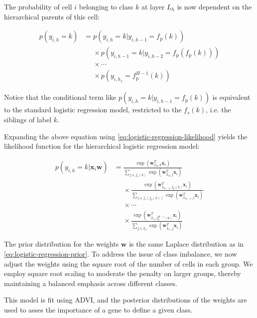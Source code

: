 The probability of cell $i$ belonging to class $k$ at layer $L_h$ is now dependent on the hierarchical parents of this cell:

\begin{equation}
    \begin{aligned}
    p(y_{i,h} = k) &= p(y_{i,h} = k | y_{i,h-1} = f_{\text{p}}(k)) \\
    &\phantom{=} \times p(y_{i,h-1} = k | y_{i,h-2} = f_{\text{p}}(f_{\text{p}}(k))) \\
    &\phantom{=} \times \cdots \\
    &\phantom{=} \times p(y_{i,h_1} = f_{\text{p}}^{H-1}(k))
    \end{aligned}
\end{equation}

Notice that the conditional term like $p(y_{i,h} = k | y_{i,h-1} = f_{\text{p}}(k))$ is equivalent to the standard logistic regression model, restricted to the $f_s(k)$, i.e. the siblings of label $k$. 

Expanding the above equation using \cref{eq:logistic-regression-likelihood} yields the likelihood function for the hierarchical logistic regression model:

\begin{equation}
    \begin{aligned}
    p(y_{i,h} = k | \mathbf{x}_{i} \mathbf{w}) &= 
         \frac{\exp(\mathbf{w}_{L_h, k}^T \mathbf{x}_i)}{\sum_{j \in f_s(k)} \exp(\mathbf{w}_{L_h, j}^T \mathbf{x}_i)} \\
        &\phantom{=} \times \frac{\exp(\mathbf{w}_{L_{h-1}, f_p(k)}^T \mathbf{x}_i)}{\sum_{j \in  f_s(f_p(k))} \exp(\mathbf{w}_{L_{h-1}, j}^T \mathbf{x}_i)} \\
        &\phantom{=} \times \cdots \\
        &\phantom{=} \times \frac{\exp(\mathbf{w}_{L_1, f_p^{H-1}(k)}^T \mathbf{x}_i)}{\sum_{j \in L_1} \exp(\mathbf{w}_{L_1, j}^T \mathbf{x}_i)}
    \end{aligned}
\end{equation}

The prior distribution for the weights $\mathbf{w}$ is the same Laplace distribution as in \cref{eq:logistic-regression-prior}. To address the issue of class imbalance, we now adjust the weights using the square root of the number of cells in each group. We employ square root scaling to moderate the penalty on larger groups, thereby maintaining a balanced emphasis across different classes.

This model is fit using \ac{ADVI}, and the posterior distributions of the weights are used to asses the importance of a gene to define a given class. 

